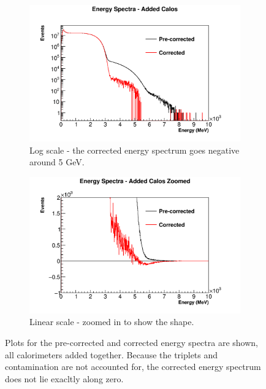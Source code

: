 \begin{figure}[]
\centering
    \begin{subfigure}[]{0.8\textwidth}
	    \centering
		\includegraphics[width=\textwidth]{AddedEnergies}
	    \caption{Log scale - the corrected energy spectrum goes negative around 5 GeV.}
    \end{subfigure}%
    \vspace{1cm}
    \begin{subfigure}[]{0.8\textwidth}
	    \centering
		\includegraphics[width=\textwidth]{AddedEnergiesZoomed}
	    \caption{Linear scale - zoomed in to show the shape.}
    \end{subfigure}
\caption[AddedEnergies]{Plots for the pre-corrected and corrected energy spectra are shown, all calorimeters added together. Because the triplets and contamination are not accounted for, the corrected energy spectrum does not lie exacltly along zero.}
\label{fig:AddedEnergies}
\end{figure}

